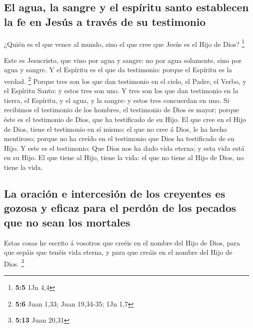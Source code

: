\hypertarget{el-agua-la-sangre-y-el-espuxedritu-santo-establecen-la-fe-en-jesuxfas-a-travuxe9s-de-su-testimonio}{%
\subsection{El agua, la sangre y el espíritu santo establecen la fe en
Jesús a través de su
testimonio}\label{el-agua-la-sangre-y-el-espuxedritu-santo-establecen-la-fe-en-jesuxfas-a-travuxe9s-de-su-testimonio}}

 ¿Quién es el que vence al mundo, sino el que cree que Jesús
es el Hijo de Dios? \footnote{\textbf{5:5} 1Jn 4,4}

 Este es Jesucristo, que vino por agua y sangre: no por agua
solamente, sino por agua y sangre. Y el Espíritu es el que da
testimonio: porque el Espíritu es la verdad. \footnote{\textbf{5:6} Juan
  1,33; Juan 19,34-35; 1Jn 1,7}  Porque tres son los que dan
testimonio en el cielo, el Padre, el Verbo, y el Espíritu Santo: y estos
tres son uno.  Y tres son los que dan testimonio en la
tierra, el Espíritu, y el agua, y la sangre: y estos tres concuerdan en
uno.  Si recibimos el testimonio de los hombres, el
testimonio de Dios es mayor; porque éste es el testimonio de Dios, que
ha testificado de su Hijo.  El que cree en el Hijo de Dios,
tiene el testimonio en sí mismo: el que no cree á Dios, le ha hecho
mentiroso; porque no ha creído en el testimonio que Dios ha testificado
de su Hijo.  Y este es el testimonio: Que Dios nos ha dado
vida eterna; y esta vida está en su Hijo.  El que tiene al
Hijo, tiene la vida: el que no tiene al Hijo de Dios, no tiene la vida.

\hypertarget{la-oraciuxf3n-e-intercesiuxf3n-de-los-creyentes-es-gozosa-y-eficaz-para-el-perduxf3n-de-los-pecados-que-no-sean-los-mortales}{%
\subsection{La oración e intercesión de los creyentes es gozosa y eficaz
para el perdón de los pecados que no sean los
mortales}\label{la-oraciuxf3n-e-intercesiuxf3n-de-los-creyentes-es-gozosa-y-eficaz-para-el-perduxf3n-de-los-pecados-que-no-sean-los-mortales}}

 Estas cosas he escrito á vosotros que creéis en el nombre
del Hijo de Dios, para que sepáis que tenéis vida eterna, y para que
creáis en el nombre del Hijo de Dios. \footnote{\textbf{5:13} Juan 20,31}

